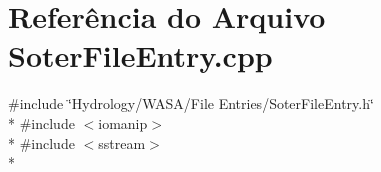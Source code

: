 \section{Referência do Arquivo Soter\+File\+Entry.\+cpp}
\label{_soter_file_entry_8cpp}
{\ttfamily \#include \char`\"{}Hydrology/\+W\+A\+S\+A/\+File Entries/\+Soter\+File\+Entry.\+h\char`\"{}}\\*
{\ttfamily \#include $<$iomanip$>$}\\*
{\ttfamily \#include $<$sstream$>$}\\*
